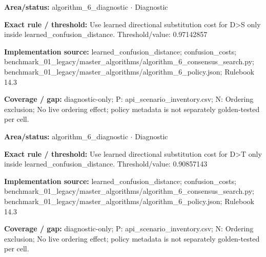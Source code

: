 \begin{tcolorbox}[enhanced,breakable,colback=white,colframe=Muted!45,boxrule=0.45pt,arc=1.5pt,left=6pt,right=6pt,top=5pt,bottom=5pt,title={\texttt{A6-LEARNED-SUBSTITUTION-D-S}},title after break={\texttt{A6-LEARNED-SUBSTITUTION-D-S}\ (continued)},fonttitle=\headingfont\bfseries\color{Navy},coltitle=Navy]
\textbf{Area/status:} algorithm\_\allowbreak{}6\_\allowbreak{}diagnostic $\boldsymbol{\cdot}$ Diagnostic\par
\smallskip
\textbf{Exact rule / threshold:} Use learned directional substitution cost for D>S only inside learned\_\allowbreak{}confusion\_\allowbreak{}distance. Threshold/\allowbreak{}value: 0.97142857\par
\smallskip
\textbf{Implementation source:} learned\_\allowbreak{}confusion\_\allowbreak{}distance; confusion\_\allowbreak{}costs; benchmark\_\allowbreak{}01\_\allowbreak{}legacy/\allowbreak{}master\_\allowbreak{}algorithms/\allowbreak{}algorithm\_\allowbreak{}6\_\allowbreak{}consensus\_\allowbreak{}search.py; benchmark\_\allowbreak{}01\_\allowbreak{}legacy/\allowbreak{}master\_\allowbreak{}algorithms/\allowbreak{}algorithm\_\allowbreak{}6\_\allowbreak{}policy.json; Rulebook 14.3\par
\smallskip
\textbf{Coverage / gap:} diagnostic-only; P: api\_\allowbreak{}scenario\_\allowbreak{}inventory.csv; N: Ordering exclusion; No live ordering effect; policy metadata is not separately golden-tested per cell.
\end{tcolorbox}
\begin{tcolorbox}[enhanced,breakable,colback=white,colframe=Muted!45,boxrule=0.45pt,arc=1.5pt,left=6pt,right=6pt,top=5pt,bottom=5pt,title={\texttt{A6-LEARNED-SUBSTITUTION-D-T}},title after break={\texttt{A6-LEARNED-SUBSTITUTION-D-T}\ (continued)},fonttitle=\headingfont\bfseries\color{Navy},coltitle=Navy]
\textbf{Area/status:} algorithm\_\allowbreak{}6\_\allowbreak{}diagnostic $\boldsymbol{\cdot}$ Diagnostic\par
\smallskip
\textbf{Exact rule / threshold:} Use learned directional substitution cost for D>T only inside learned\_\allowbreak{}confusion\_\allowbreak{}distance. Threshold/\allowbreak{}value: 0.90857143\par
\smallskip
\textbf{Implementation source:} learned\_\allowbreak{}confusion\_\allowbreak{}distance; confusion\_\allowbreak{}costs; benchmark\_\allowbreak{}01\_\allowbreak{}legacy/\allowbreak{}master\_\allowbreak{}algorithms/\allowbreak{}algorithm\_\allowbreak{}6\_\allowbreak{}consensus\_\allowbreak{}search.py; benchmark\_\allowbreak{}01\_\allowbreak{}legacy/\allowbreak{}master\_\allowbreak{}algorithms/\allowbreak{}algorithm\_\allowbreak{}6\_\allowbreak{}policy.json; Rulebook 14.3\par
\smallskip
\textbf{Coverage / gap:} diagnostic-only; P: api\_\allowbreak{}scenario\_\allowbreak{}inventory.csv; N: Ordering exclusion; No live ordering effect; policy metadata is not separately golden-tested per cell.
\end{tcolorbox}
